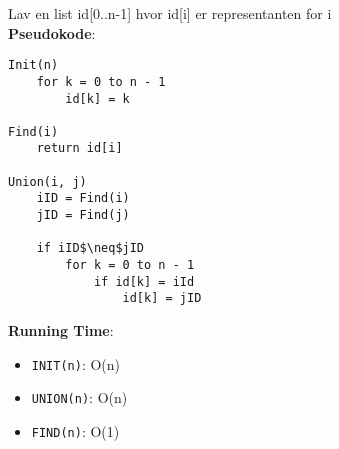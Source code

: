 Lav en list id[0..n-1] hvor id[i] er representanten for i\\
\textbf{Pseudokode}:
\begin{lstlisting}[frame=single, mathescape=true]
Init(n)
	for k = 0 to n - 1
		id[k] = k

Find(i)
	return id[i]

Union(i, j)
	iID = Find(i)
	jID = Find(j)

	if iID$\neq$jID
		for k = 0 to n - 1
			if id[k] = iId
				id[k] = jID
\end{lstlisting}
\textbf{Running Time}:
\begin{itemize}
	\item \texttt{INIT(n)}: O(n)
	\item \texttt{UNION(n)}: O(n)
	\item \texttt{FIND(n)}: O(1)
\end{itemize}